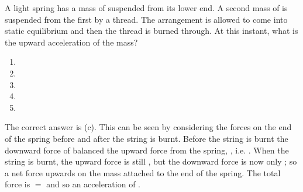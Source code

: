 

\begin{problem} 
{A light spring has a mass of  suspended from its lower end. A second mass of  is suspended from the first by a thread. The arrangement is allowed to come into static equilibrium and then the thread is burned through. At this instant, what is the upward acceleration of the  mass?
\begin{enumerate}
	\item {}
	\item {}
	\item {}\answer
	\item {}
	\item {}
\end{enumerate}
}
{}
{The correct answer is (c). This can be seen by considering the forces on the end of the spring before and after the string is burnt. Before the string is burnt the downward force of  balanced the upward force from the spring, , i.e. . When the string is burnt, the upward force is still , but the downward force is now only ; so a net force upwards on the mass attached to the end of the spring. The total force is  $=$  and so an acceleration of .
}
\end{problem}